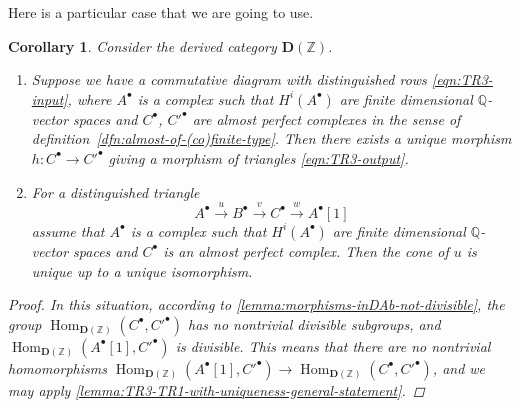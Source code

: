 \documentclass[leqno,12pt]{article}
\theoremstyle{plain}
\newtheorem{corollary}[theorem]{\indent\sc Corollary}
\theoremstyle{definition}
\DeclareMathOperator{\Hom}{Hom}
\newcommand{\QQ}{\mathbb{Q}}
\newcommand{\ZZ}{\mathbb{Z}}
\begin{document}
Here is a particular case that we are going to use.

\begin{corollary}
  \label{cor:TR3-TR1-with-uniqueness}
  Consider the derived category $\mathbf{D} (\ZZ)$.

  \begin{enumerate}
  \item[$1)$] Suppose we have a commutative diagram with distinguished rows
    \eqref{eqn:TR3-input}, where $A^\bullet$ is a complex such that
    $H^i (A^\bullet)$ are finite dimensional $\QQ$-vector spaces and
    $C^\bullet$, $C'^\bullet$ are almost perfect complexes in the sense of
    definition~{\rm\ref{dfn:almost-of-(co)finite-type}}. Then there exists a unique
    morphism ${h\colon C^\bullet \to C'^\bullet}$ giving a morphism of triangles
    \eqref{eqn:TR3-output}.

  \item[$2)$] For a distinguished triangle
    $$A^\bullet \xrightarrow{u} B^\bullet \xrightarrow{v} C^\bullet \xrightarrow{w} A^\bullet[1]$$
    assume that $A^\bullet$ is a complex such that $H^i (A^\bullet)$ are finite
    dimensional $\QQ$-vector spaces and $C^\bullet$ is an almost perfect
    complex. Then the cone of $u$ is unique up to a unique isomorphism.
  \end{enumerate}

  \begin{proof}
    In this situation, according to \ref{lemma:morphisms-inDAb-not-divisible},
    the group $\Hom_{\mathbf{D} (\ZZ)} (C^\bullet, C'^\bullet)$ has no
    nontrivial divisible subgroups, and
    $\Hom_{\mathbf{D} (\ZZ)} (A^\bullet [1], C'^\bullet)$ is divisible. This
    means that there are no nontrivial homomorphisms
    $\Hom_{\mathbf{D} (\ZZ)} (A^\bullet [1], C'^\bullet) \to \Hom_{\mathbf{D} (\ZZ)} (C^\bullet, C'^\bullet)$,
    and we may apply \ref{lemma:TR3-TR1-with-uniqueness-general-statement}.
  \end{proof}
\end{corollary}
\end{document}
